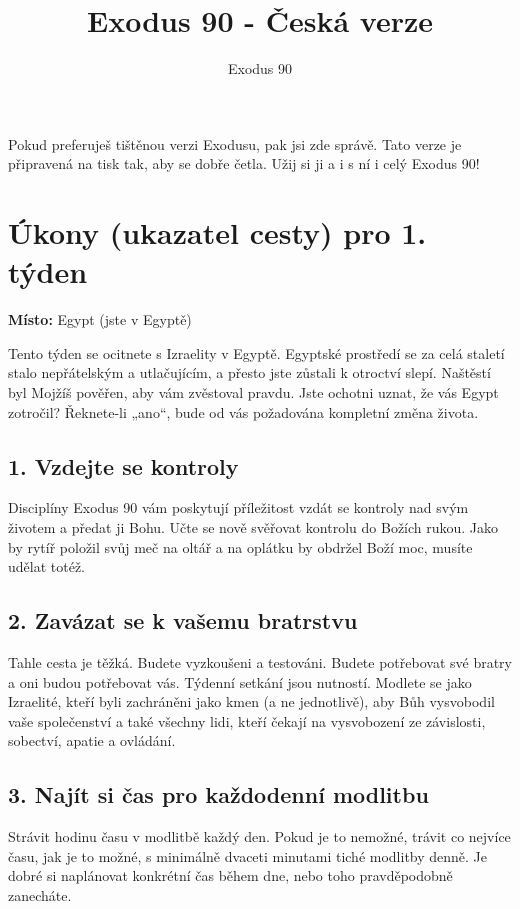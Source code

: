 \documentclass[11pt]{article}
\author{Exodus 90}
\title{\myfont Exodus 90 - Česká verze}
\date{}							%
\begin{document}
\maketitle
\vspace*{\fill}
Pokud preferuješ tištěnou verzi Exodusu, pak jsi zde správě. Tato verze je připravená na tisk tak, aby se dobře četla. Užij si ji a i s ní i celý Exodus 90!

\newpage
\section*{Úkony (ukazatel cesty) pro 1. týden}

\textbf{Místo:} Egypt (jste v Egyptě)

Tento týden se ocitnete s Izraelity v Egyptě. Egyptské prostředí se za celá staletí stalo nepřátelským a utlačujícím, a přesto jste zůstali k otroctví slepí. Naštěstí byl Mojžíš pověřen, aby vám zvěstoval pravdu. Jste ochotni uznat, že vás Egypt zotročil? Řeknete-li „ano“, bude od vás požadována kompletní změna života.

\subsection*{1. Vzdejte se kontroly}
Disciplíny Exodus 90 vám poskytují příležitost vzdát se kontroly nad svým životem a předat ji Bohu. Učte se nově svěřovat kontrolu do Božích rukou. Jako by rytíř položil svůj meč na oltář a na oplátku by obdržel Boží moc, musíte udělat totéž.

\subsection*{2. Zavázat se k vašemu bratrstvu}
Tahle cesta je těžká. Budete vyzkoušeni a testováni. Budete potřebovat své bratry a oni budou potřebovat vás. Týdenní setkání jsou nutností. Modlete se jako Izraelité, kteří byli zachráněni jako kmen (a ne jednotlivě), aby Bůh vysvobodil vaše společenství a také všechny lidi, kteří čekají na vysvobození ze závislosti, sobectví, apatie a ovládání.

\subsection*{3. Najít si čas pro každodenní modlitbu}
Strávit hodinu času v modlitbě každý den. Pokud je to nemožné, trávit co nejvíce času, jak je to možné, s minimálně dvaceti minutami tiché modlitby denně. Je dobré si naplánovat konkrétní čas během dne, nebo toho pravděpodobně zanecháte.
\end{document}
